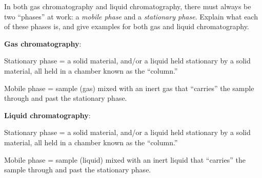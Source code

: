 

In both gas chromatography and liquid chromatography, there must always be two ``phases'' at work: a {\it mobile phase} and a {\it stationary phase}.  Explain what each of these phases is, and give examples for both gas and liquid chromatography.







\noindent
{\bf Gas chromatography}:

\vskip 10pt

Stationary phase = a solid material, and/or a liquid held stationary by a solid material, all held in a chamber known as the ``column.''

\vskip 10pt

Mobile phase = sample (gas) mixed with an inert gas that ``carries'' the sample through and past the stationary phase.

\vskip 40pt

\noindent
{\bf Liquid chromatography}:

\vskip 10pt

Stationary phase = a solid material, and/or a liquid held stationary by a solid material, all held in a chamber known as the ``column.''

\vskip 10pt

Mobile phase = sample (liquid) mixed with an inert liquid that ``carries'' the sample through and past the stationary phase.











